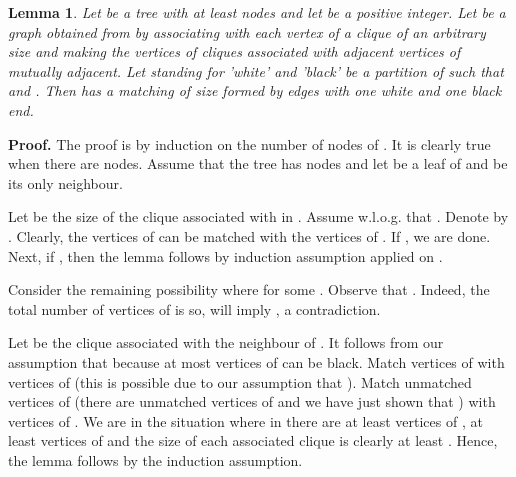 \documentclass{article}
\newtheorem{lemma}{Lemma}
\begin{document}
\begin{lemma} \label{kmatching}
Let  be a tree with at least  nodes and let  be a positive integer.
Let  be a graph obtained from  by associating
with each vertex of  a clique of an arbitrary size 
and making the vertices of cliques associated with adjacent vertices
of  mutually adjacent. Let  standing for 'white'
and 'black' be a partition of  such that 
and . Then  has a matching of size  formed by edges
with one white and one black end.
\end{lemma}

{\bf Proof.}
The proof is by induction
on the number of nodes of . It is clearly true when there are  nodes.
Assume that the tree has  nodes and let  be a leaf of 
and  be its only neighbour. 

Let  be the size of the clique  associated with  in .
Assume w.l.o.g. that . Denote 
by . Clearly, the  vertices of  can be matched with the
vertices of . If , we are done. Next, 
if , then the lemma follows by induction assumption
applied on .

Consider the remaining possibility where  for some
. Observe that . Indeed, the total number of vertices of 
 is  so,  will imply , a contradiction.

Let  be the clique associated 
with the neighbour  of . It follows from our assumption that 
because at most  vertices of  can be black. Match  vertices
of  with vertices of  (this is possible due to our assumption that
). Match  unmatched vertices of 
 (there are  unmatched vertices of  and we have just shown
that ) with  vertices of . We are in the situation where
in  there are at least  vertices of , at least
 vertices of  and the size of each associated clique is clearly at 
least . Hence, the lemma follows by the induction assumption.
\end{document}

